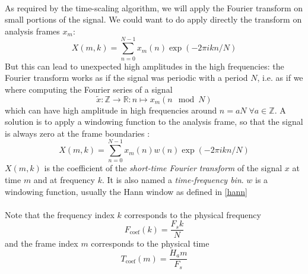 \documentclass[letterpaper]{article}
\begin{document}
\paragraph{}
As required by the time-scaling algorithm, we will apply the Fourier transform
on small portions of the signal. We could want to do apply directly the
transform on analysis frames \(x_m\):
\begin{equation*}
X(m,k)=\sum_{n=0}^{N-1}x_m(n)\exp(-2\pi ikn/N)
\end{equation*}
But this can lead to unexpected high amplitudes in the high frequencies:
the Fourier transform works as if the signal was periodic with a period \(N\),
i.e. as if we where computing the Fourier series of a signal
\begin{equation}
\tilde x:\mathbb{Z}\to\mathbb{R}:n\mapsto x_m(n\mod N)
\end{equation}
which can have high amplitude in high frequencies around
\(n=aN\;\forall a\in\mathbb{Z}\).
A solution is to apply a windowing function to the analysis frame, so that the
signal is always zero at the frame boundaries
\citep{gabor1946theory}:
\begin{equation}
    X(m,k) = \sum_{n=0}^{N-1}x_m(n)w(n)\exp(-2\pi ikn/N)
\end{equation}
\(X(m,k)\) is the coefficient of the \emph{short-time Fourier transform} of
the signal \(x\) at time \(m\) and at frequency \(k\). It is also named a
\emph{time-frequency bin}. \(w\) is a windowing function, usually the Hann
window as defined in \eqref{hann}

\paragraph{}
Note that the frequency index \(k\) corresponds to the physical frequency
\begin{equation}
		\label{frequency_index}
    F_{\text{coef}}(k) = \frac{F_s k}{N}
\end{equation}
and the frame index \(m\) corresponds to the physical time
\begin{equation}
    T_{\text{coef}}(m) = \frac{H_a m}{F_s}
\end{equation}
\end{document}

